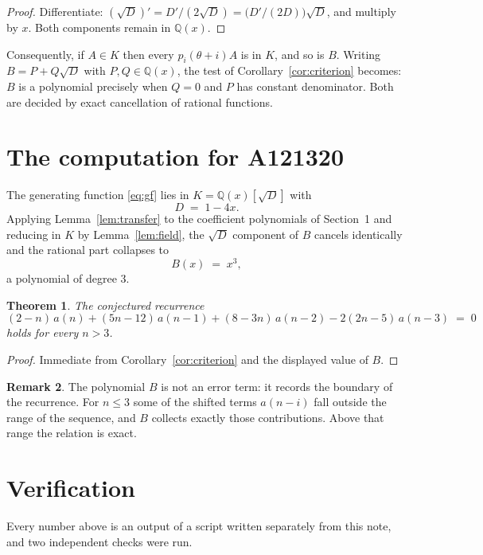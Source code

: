 \documentclass[11pt,a4paper]{article}
\theoremstyle{plain}
\newtheorem{theorem}{Theorem}
\theoremstyle{definition}
\newtheorem{remark}[theorem]{Remark}
\begin{document}
\begin{proof}
Differentiate: $(\sqrt{D})'=D'/(2\sqrt{D})=\bigl(D'/(2D)\bigr)\sqrt{D}$, and multiply by
$x$. Both components remain in $\mathbb{Q}(x)$.
\end{proof}

Consequently, if $A\in K$ then every $p_{i}(\theta+i)A$ is in $K$, and so is $B$. Writing
$B=P+Q\sqrt{D}$ with $P,Q\in\mathbb{Q}(x)$, the test of Corollary~\ref{cor:criterion}
becomes: $B$ is a polynomial precisely when $Q=0$ and $P$ has constant denominator. Both
are decided by exact cancellation of rational functions.

\section{The computation for A121320}

The generating function \eqref{eq:gf} lies in $K=\mathbb{Q}(x)[\sqrt{D}]$ with
\[
D \;=\; 1 - 4 x .
\]
Applying Lemma~\ref{lem:transfer} to the coefficient polynomials of Section~1 and reducing
in $K$ by Lemma~\ref{lem:field}, the $\sqrt{D}$ component of $B$ cancels identically and
the rational part collapses to
\[
B(x)\;=\;x^{3} ,
\]
a polynomial of degree $3$.

\begin{theorem}
The conjectured recurrence
\[
(2 - n)\,a(n) + (5 n - 12)\,a(n-1) + (8 - 3 n)\,a(n-2) -  2 \left(2 n - 5\right)\,a(n-3) \;=\;0
\]
holds for every $n>3$.
\end{theorem}

\begin{proof}
Immediate from Corollary~\ref{cor:criterion} and the displayed value of $B$.
\end{proof}

\begin{remark}
The polynomial $B$ is not an error term: it records the boundary of the recurrence. For
$n\le3$ some of the shifted terms $a(n-i)$ fall outside the range of the sequence,
and $B$ collects exactly those contributions. Above that range the relation is exact.
\end{remark}

\section{Verification}

Every number above is an output of a script written separately from this note, and two
independent checks were run.
\end{document}
